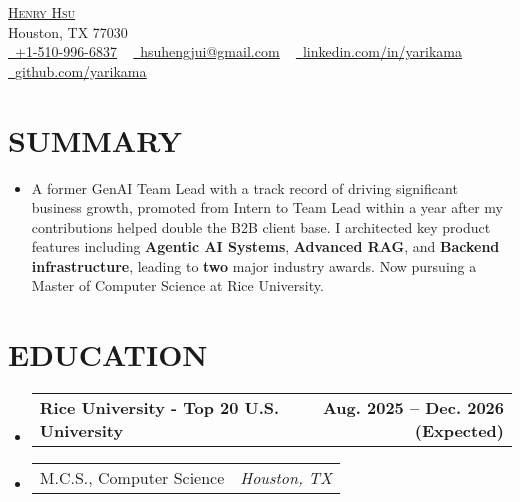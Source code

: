 \documentclass[letterpaper,11pt]{article}
\makeatletter
\newcommand{\mylocation}{
  Houston, TX 77030
}
\newcommand{\resumeSubheadingnull}[2]{
  \item
    \begin{tabular*}{1.0\textwidth}[t]{l@{\extracolsep{\fill}}r}
      \textbf{#1} & \textbf{\small #2} \\
    \end{tabular*}\vspace{3pt}
}
\newcommand{\resumeSubItema}[2]{
  \item
    \begin{tabular*}{1.0\textwidth}[t]{l@{\extracolsep{\fill}}r}
      \small#1 & \textit{\small #2} \\
    \end{tabular*}
}
\newcommand{\resumeSubHeadingListStart}{\begin{itemize}[leftmargin=0.0in, label={}]}
\newcommand{\resumeSubHeadingListEnd}{\end{itemize}}
\makeatother
\begin{document}

\begin{center}
	{\Huge \scshape \href{https://yarikama.world}{Henry Hsu}} \\
    {\small\color{gray} \mylocation} \\
	\href{tel:+1-510-996-6837}{\raisebox{-0.2\height}\faPhone\  \underline{+1-510-996-6837}} ~
	\href{mailto:hsuhengjui@gmail.com}{\raisebox{-0.2\height}\faEnvelope\  \underline{hsuhengjui@gmail.com}} ~
	\href{https://linkedin.com/in/yarikama/}{\raisebox{-0.2\height}\faLinkedin\ \underline{linkedin.com/in/yarikama}}  ~
	\href{https://github.com/yarikama}{\raisebox{-0.2\height}\faGithub\ \underline{github.com/yarikama}}
	\vspace{-8pt}
\end{center}

\section{SUMMARY}
\resumeSubHeadingListStart
\item\small{A former GenAI Team Lead with a track record of driving significant business growth, promoted from Intern to Team Lead within a year after my contributions helped double the B2B client base. I architected key product features including \textbf{Agentic AI Systems}, \textbf{Advanced RAG}, and \textbf{Backend infrastructure}, leading to \textbf{two} major industry awards. Now pursuing a Master of Computer Science at Rice University.}
\vspace{-2pt}
\resumeSubHeadingListEnd


\section{EDUCATION}
\resumeSubHeadingListStart
\resumeSubheadingnull
{Rice University - Top 20 U.S. University}{Aug. 2025 -- Dec. 2026 (Expected)}{}{}
\vspace{-20pt}
\resumeSubItema{M.C.S., Computer Science}{Houston, TX}
\vspace{-17pt}
\resumeSubHeadingListEnd
\end{document}

